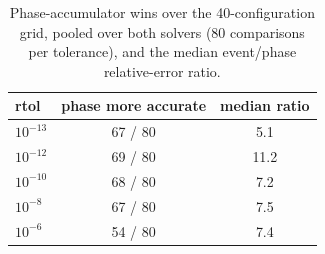 \begin{table}[!htbp]
\centering
\caption{Phase-accumulator wins over the 40-configuration grid, pooled over both solvers (80 comparisons per tolerance), and the median event/phase relative-error ratio.}
\label{tab:winrate}
\begin{tabular}{lcc}
\toprule
rtol & phase more accurate & median ratio \\
\midrule
$10^{-13}$ & 67 / 80 & 5.1 \\
$10^{-12}$ & 69 / 80 & 11.2 \\
$10^{-10}$ & 68 / 80 & 7.2 \\
$10^{-8}$ & 67 / 80 & 7.5 \\
$10^{-6}$ & 54 / 80 & 7.4 \\
\bottomrule
\end{tabular}
\end{table}
